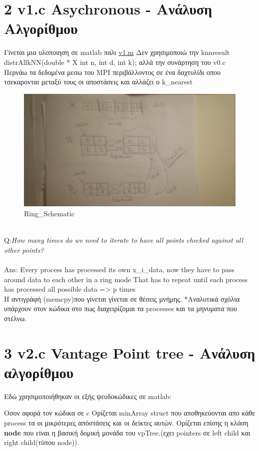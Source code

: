 \documentclass[10pt]{report}
\begin{document}
\section{2 v1.c Asychronous - Ανάλυση Αλγορίθμου}
Γίνεται μια υλοποιηση σε matlab παλι \href{https://github.com/harryfilis/Parallel-and-Distributed-Systems-Assignments/tree/master/KnnSearch/matlab/v1.m}{v1.m}
Δεν χρησιμοποιώ την knnresult distrAllkNN(double * X int n, int d, int k); αλλά την συνάρτηση του  v0.c\\
Περνάω τα δεδομένα μεσω του MPI περιβάλλοντος σε ένα δαχτυλίδι οπου τσεκαρονται μεταξύ τους οι αποστάσεις και αλλάζει ο k\_nearest
\begin{figure}[h]
    \centering
   	\includegraphics[scale=0.2,angle = 90]{../plots/ring.jpg}
    \caption{Ring\_Schematic}
    \label{fig:Ring\_Schematic}
\end{figure}\\
Q:\emph{How many times do we need to iterate to have all points checked against all other points?}\\
\\Ans: Every process has processed its own x\_i\_data, now they have to pass around data to each other in a ring mode
That has to repeat until each process has processed all possible data => p times\\

H αντιγράφή (memcpy)που γίνεται γίνεται σε θέσεις μνήμης.
*Αναλυτικά σχόλια υπάρχουν στον κώδικα στο πως διαχειρίζομαι τα processes και τα μηνυματα που στέλνω.

\section{3 v2.c Vantage Point tree - Ανάλυση αλγορίθμου}
Εδώ χρησιμοποιήθηκαν οι εξής ψευδοκώδικες σε matlab:


Οσον αφορά τον κώδικα σε c
Ορίζεται minArray struct που αποθηκεύονται απο κάθε  process τα οι μικρότερες απόστάσεις και οι δείκτες αυτών.
Oρίζεται επίσης η κλάση \textbf{node}  που είναι η βασική δομική μονάδα του vpTree.(εχει pointers σε left child και right child(τύπου node)).
\end{document}
